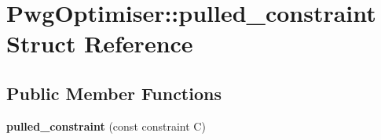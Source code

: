 \hypertarget{structPwgOptimiser_1_1pulled__constraint}{}\section{Pwg\+Optimiser\+:\+:pulled\+\_\+constraint Struct Reference}
\label{structPwgOptimiser_1_1pulled__constraint}
\subsection*{Public Member Functions}
\begin{DoxyCompactItemize}
\item 
{\bfseries pulled\+\_\+constraint} (const constraint C)\hypertarget{structPwgOptimiser_1_1pulled__constraint_a73c3accc55b8ff93376dbcf8e8ab12a2}{}\label{structPwgOptimiser_1_1pulled__constraint_a73c3accc55b8ff93376dbcf8e8ab12a2}

\end{DoxyCompactItemize}
